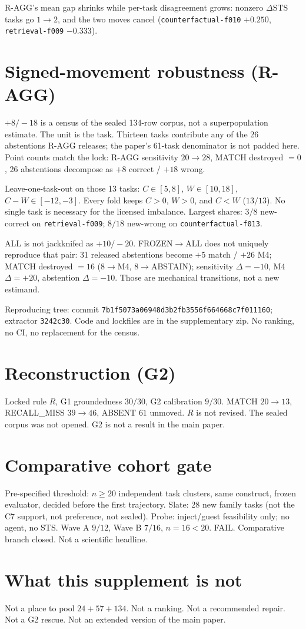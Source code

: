 \documentclass[sigconf,anonymous]{aamas}
\newcommand{\task}[1]{\texttt{#1}}
\newcommand{\STS}{\mathrm{STS}}
\begin{document}
R-AGG's mean gap shrinks while per-task disagreement grows: nonzero $\Delta\STS$ tasks go $1\to 2$, and the two moves cancel (\task{counterfactual-f010} $+0.250$, \task{retrieval-f009} $-0.333$).

\section{Signed-movement robustness (R-AGG)}

$+8/-18$ is a census of the sealed 134-row corpus, not a superpopulation estimate.
The unit is the task.
Thirteen tasks contribute any of the 26 abstentions R-AGG releases; the paper's 61-task denominator is not padded here.
Point counts match the lock: R-AGG sensitivity $20\to 28$, MATCH destroyed $=0$, 26 abstentions decompose as $+8$ correct / $+18$ wrong.

Leave-one-task-out on those 13 tasks: $C\in[5,8]$, $W\in[10,18]$, $C-W\in[-12,-3]$.
Every fold keeps $C>0$, $W>0$, and $C<W$ ($13/13$).
No single task is necessary for the licensed imbalance.
Largest shares: $3/8$ new-correct on \task{retrieval-f009}; $8/18$ new-wrong on \task{counterfactual-f013}.

ALL is not jackknifed as $+10/-20$.
FROZEN$\to$ALL does not uniquely reproduce that pair: 31 released abstentions become $+5$ match / $+26$ M4; MATCH destroyed $=16$ ($8\to$M4, $8\to$ABSTAIN); sensitivity $\Delta=-10$, M4 $\Delta=+20$, abstention $\Delta=-10$.
Those are mechanical transitions, not a new estimand.

Reproducing tree: commit \texttt{7b1f5073a06948d3b2fb3556f664668c7f011160}; extractor \texttt{3242c30}.
Code and lockfiles are in the supplementary zip.
No ranking, no CI, no replacement for the census.

\section{Reconstruction (G2)}

Locked rule $R$, G1 groundedness $30/30$, G2 calibration $9/30$.
MATCH $20\to 13$, RECALL\_MISS $39\to 46$, ABSENT $61$ unmoved.
$R$ is not revised. The sealed corpus was not opened.
G2 is not a result in the main paper.

\section{Comparative cohort gate}

Pre-specified threshold: $n\ge 20$ independent task clusters, same construct, frozen evaluator, decided before the first trajectory.
Slate: 28 new family tasks (not the C7 support, not preference, not sealed).
Probe: inject/guest feasibility only; no agent, no STS.
Wave A $9/12$, Wave B $7/16$, $n=16<20$.
FAIL. Comparative branch closed. Not a scientific headline.

\section{What this supplement is not}

Not a place to pool $24+57+134$.
Not a ranking.
Not a recommended repair.
Not a G2 rescue.
Not an extended version of the main paper.
\end{document}
